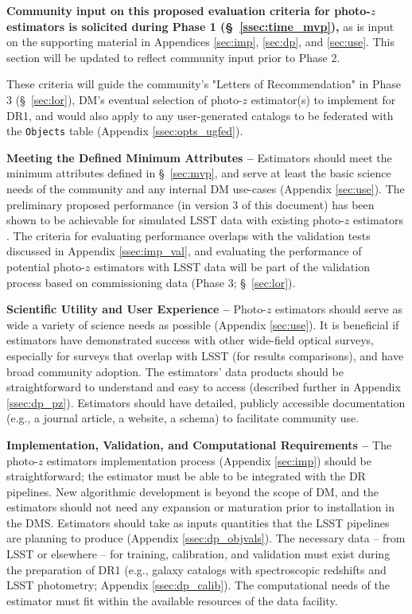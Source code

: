\documentclass[DM,lsstdraft,toc]{lsstdoc}
\begin{document}
\textbf{Community input on this proposed evaluation criteria for photo-$z$ estimators is solicited during Phase 1 (\S~\ref{ssec:time_mvp}),} as is input on the supporting material in Appendices \ref{sec:imp}, \ref{sec:dp}, and \ref{sec:use}.
This section will be updated to reflect community input prior to Phase 2.

These criteria will guide the community's "Letters of Recommendation" in Phase 3 (\S~\ref{sec:lor}), DM's eventual selection of photo-$z$ estimator(s) to implement for DR1, and would also apply to any user-generated catalogs to be federated with the {\tt Objects} table (Appendix \ref{ssec:opts_ugfed}).

{\bf Meeting the Defined Minimum Attributes --}
Estimators should meet the minimum attributes defined in \S~\ref{sec:mvp}, and serve at least the basic science needs of the community and any internal DM use-cases (Appendix \ref{sec:use}).
The preliminary proposed performance (in version 3 of this document) has been shown to be achievable for simulated LSST data with existing photo-$z$ estimators \citep[e.g.,][]{2018AJ....155....1G,2020arXiv200103621S}.
The criteria for evaluating performance overlaps with the validation tests discussed in Appendix \ref{ssec:imp_val}, and evaluating the performance of potential photo-$z$ estimators with LSST data will be part of the validation process based on commissioning data (Phase 3; \S~\ref{sec:lor}).

{\bf Scientific Utility and User Experience --}
Photo-$z$ estimators should serve as wide a variety of science needs as possible (Appendix \ref{sec:use}).
It is beneficial if estimators have demonstrated success with other wide-field optical surveys, especially for surveys that overlap with LSST (for results comparisons), and have broad community adoption.
The estimators' data products should be straightforward to understand and easy to access (described further in Appendix \ref{ssec:dp_pz}).
Estimators should have detailed, publicly accessible documentation (e.g., a journal article, a website, a schema) to facilitate community use.

{\bf Implementation, Validation, and Computational Requirements --}
The photo-$z$ estimators implementation process (Appendix \ref{sec:imp}) should be straightforward; the estimator must be able to be integrated with the DR pipelines. 
New algorithmic development is beyond the scope of DM, and the estimators should not need any expansion or maturation prior to installation in the DMS.
Estimators should take as inputs quantities that the LSST pipelines are planning to produce (Appendix \ref{ssec:dp_objvals}).
The necessary data -- from LSST or elsewhere -- for training, calibration, and validation must exist during the preparation of DR1 (e.g., galaxy catalogs with spectroscopic redshifts and LSST photometry; Appendix \ref{ssec:dp_calib}).
The computational needs of the estimator must fit within the available resources of the data facility.
\end{document}

